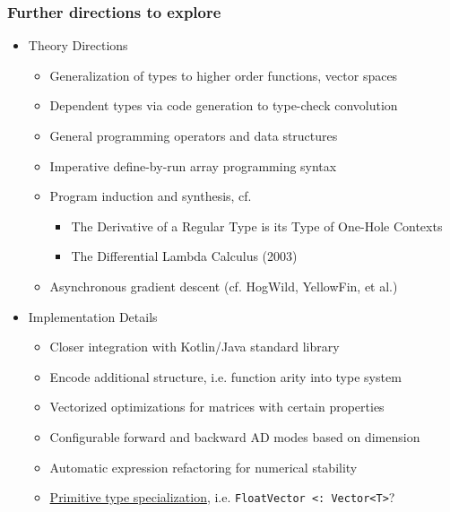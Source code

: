 \documentclass{beamer}
\begin{document}
    \begin{frame}
        \frametitle{Further directions to explore}
        \begin{itemize}
            \item Theory Directions
            \begin{itemize}
                \item Generalization of types to higher order functions, vector spaces
                \item Dependent types via code generation to type-check convolution
                \item General programming operators and data structures
                \item Imperative define-by-run array programming syntax
                \item Program induction and synthesis, cf.
                \begin{itemize}
                    \item The Derivative of a Regular Type is its Type of One-Hole Contexts
                    \item The Differential Lambda Calculus (2003)
                \end{itemize}
                \item Asynchronous gradient descent (cf. HogWild, YellowFin, et al.)
            \end{itemize}
            \item Implementation Details
            \begin{itemize}
                \item Closer integration with Kotlin/Java standard library
                \item Encode additional structure, i.e. function arity into type system
                \item Vectorized optimizations for matrices with certain properties
                \item Configurable forward and backward AD modes based on dimension
                \item Automatic expression refactoring for numerical stability
                \item \href{https://discuss.kotlinlang.org/t/primitive-type-specialization/11022}{Primitive type specialization}, i.e. \texttt{FloatVector <: Vector<T>}?
            \end{itemize}
        \end{itemize}
    \end{frame}
\end{document}
